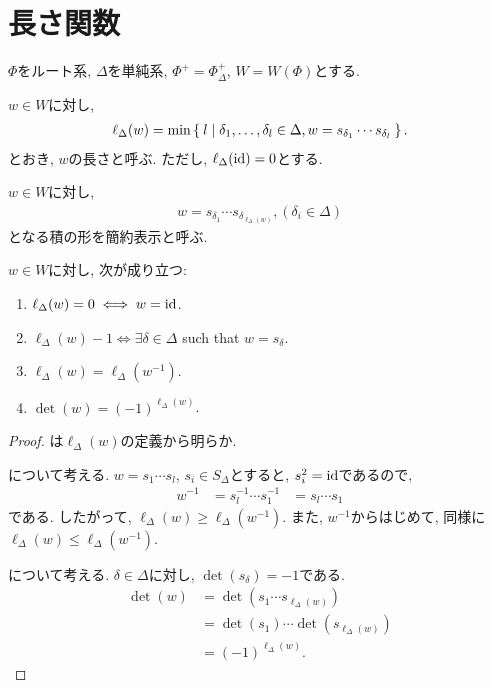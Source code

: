 \section{長さ関数}
$\Phi$をルート系, $\Delta$を単純系, $\Phi^+=\Phi_\Delta^+$, $W=W(\Phi)$とする.

\begin{definition}
  $w\in W$に対し,
  \begin{align*}
    \ell_\Delta(w)=\min\Set{l|\delta_1,\ldots,\delta_l\in \Delta, w=s_{\delta_1}\cdots s_{\delta_l}}.
  \end{align*}
  とおき, $w$の長さと呼ぶ.
  ただし, $\ell_\Delta(\operatorname{id})=0$とする.
\end{definition}
\begin{definition}
  $w\in W$に対し,
  \begin{align*}
    w=s_{\delta_1}\cdots s_{\delta_{\ell_\Delta(w)}}, (\delta_i\in \Delta)
  \end{align*}
  となる積の形を簡約表示と呼ぶ.  
\end{definition}
\begin{prop}
  $w\in W$に対し, 次が成り立つ:
  \begin{enumerate}
  \item
    \label{item:len:nilisid}
    $\ell_\Delta(w)=0 \iff w=\operatorname{id}$.
  \item
    \label{item:len:1issimple}
    $\ell_\Delta(w)-1 \iff \exists \delta\in\Delta$ such that $w=s_\delta$.
  \item
    \label{item:len:inversestable}
    $\ell_\Delta(w)=\ell_\Delta(w^{-1})$.
  \item
    \label{item:len:det}
    $\det(w)=(-1)^{\ell_\Delta(w)}$.
  \end{enumerate}
\end{prop}
\begin{proof}
  は$\ell_\Delta(w)$の定義から明らか.

  について考える.
  $w=s_1\cdots s_l$, $s_i\in S_\Delta$とすると,
  $s_i^2=\operatorname{id}$であるので,
  \begin{align*}
    w^{-1}
    &=s_l^{-1}\cdots s_1^{-1}
    &=s_l\cdots s_1
  \end{align*}
  である. したがって, $\ell_\Delta(w) \geq \ell_\Delta(w^{-1})$.
  また,
  $w^{-1}$からはじめて,
  同様に$\ell_\Delta(w) \leq \ell_\Delta(w^{-1})$.

  について考える.
  $\delta\in\Delta$に対し, $\det(s_\delta)=-1$である.
  \begin{align*}
    \det(w)&=\det(s_1\cdots s_{\ell_\Delta(w)})\\
    &=\det(s_1)\cdots \det(s_{\ell_\Delta(w)})\\
    &=(-1)^{\ell_\Delta(w)}.
  \end{align*}
\end{proof}

